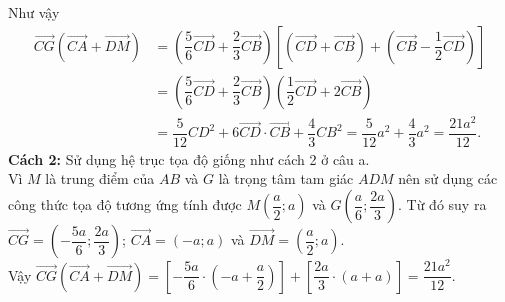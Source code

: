 \begin{vd}
{\begin{enumerate}
			      Như vậy
			      \begin{align*}
				      \overrightarrow{CG}\left (\overrightarrow{CA}+\overrightarrow{DM}\right ) & =\left( \dfrac{5}{6}\overrightarrow{CD}+\dfrac{2}{3}\overrightarrow{CB} \right)\left [\left( \overrightarrow{CD}+\overrightarrow{CB} \right)+\left( \overrightarrow{CB}-\dfrac{1}{2}\overrightarrow{CD}  \right)  \right ] \\
				                                                                                & =\left( \dfrac{5}{6}\overrightarrow{CD}+\dfrac{2}{3}\overrightarrow{CB} \right)\left( \dfrac{1}{2}\overrightarrow{CD}+2\overrightarrow{CB} \right)                                                                         \\
				                                                                                & =\dfrac{5}{12}CD^2+6\overrightarrow{CD}\cdot \overrightarrow{CB}+ \dfrac{4}{3}CB^2=\dfrac{5}{12}a^2+\dfrac{4}{3}a^2=\dfrac{21a^2}{12}.
			      \end{align*}
			      \textbf{Cách 2:} Sử dụng hệ trục tọa độ giống như cách 2 ở câu a.\\
			      Vì $ M $ là trung điểm của $ AB $ và $ G $ là trọng tâm tam giác $ ADM $ nên sử dụng các công thức tọa độ tương ứng tính được $ M\left (\dfrac{a}{2};a\right ) $ và $ G\left ( \dfrac{a}{6}; \dfrac{2a}{3} \right ) $. Từ đó suy ra $ \overrightarrow{CG}=\left(-\dfrac{5a}{6}; \dfrac{2a}{3} \right)  $; $ \overrightarrow{CA}=(-a;a) $ và $ \overrightarrow{DM}=\left (\dfrac{a}{2};a\right ) $.\\
			      Vậy $ \overrightarrow{CG}\left (\overrightarrow{CA}+\overrightarrow{DM}\right )=\left [-\dfrac{5a}{6}\cdot \left (-a+\dfrac{a}{2}\right ) \right ]+\left [\dfrac{2a}{3}\cdot (a+a)\right ]=\dfrac{21a^2}{12} $.
		\end{enumerate}
	}
\end{vd}


